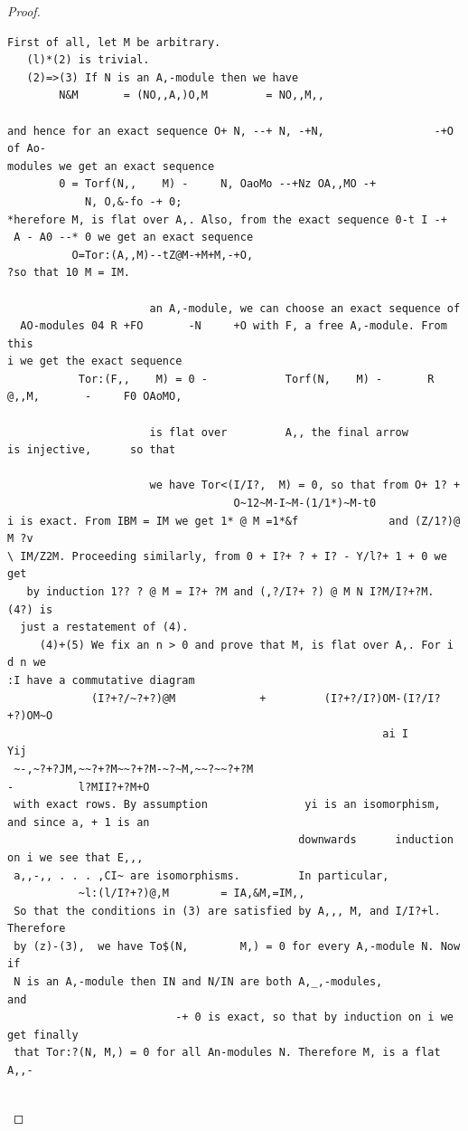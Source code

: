 \begin{proof}
\begin{verbatim}
First of all, let M be arbitrary.
   (l)*(2) is trivial.
   (2)=>(3) If N is an A,-module then we have
        N&M       = (NO,,A,)O,M         = NO,,M,,

and hence for an exact sequence O+ N, --+ N, -+N,                 -+O of Ao-
modules we get an exact sequence
        0 = Torf(N,,    M) -     N, OaoMo --+Nz OA,,MO -+
            N, O,&-fo -+ 0;
*herefore M, is flat over A,. Also, from the exact sequence 0-t I -+
 A - A0 --* 0 we get an exact sequence
          O=Tor:(A,,M)--tZ@M-+M+M,-+O,
?so that 10 M = IM.

                      an A,-module, we can choose an exact sequence of
  AO-modules 04 R +FO       -N     +O with F, a free A,-module. From this
i we get the exact sequence
           Tor:(F,,    M) = 0 -            Torf(N,    M) -       R @,,M,       -     F0 OAoMO,

                      is flat over         A,, the final arrow          is injective,      so that

                      we have Tor<(I/I?,  M) = 0, so that from O+ 1? +
                                   O~12~M-I~M-(1/1*)~M-t0
i is exact. From IBM = IM we get 1* @ M =1*&f              and (Z/1?)@ M ?v
\ IM/Z2M. Proceeding similarly, from 0 + I?+ ? + I? - Y/l?+ 1 + 0 we get
   by induction 1?? ? @ M = I?+ ?M and (,?/I?+ ?) @ M N I?M/I?+?M.     (4?) is
  just a restatement of (4).
     (4)+(5) We fix an n > 0 and prove that M, is flat over A,. For i d n we
:I have a commutative diagram
             (I?+?/~?+?)@M             +         (I?+?/I?)OM-(I?/I?+?)OM~O
                                                          ai I                       Yij
 ~-,~?+?JM,~~?+?M~~?+?M-~?~M,~~?~~?+?M                                  -          l?MII?+?M+O
 with exact rows. By assumption               yi is an isomorphism,          and since a, + 1 is an
                                             downwards      induction        on i we see that E,,,
 a,,-,, . . . ,CI~ are isomorphisms.         In particular,
           ~l:(l/I?+?)@,M        = IA,&M,=IM,,
 So that the conditions in (3) are satisfied by A,,, M, and I/I?+l. Therefore
 by (z)-(3),  we have To$(N,        M,) = 0 for every A,-module N. Now if
 N is an A,-module then IN and N/IN are both A,_,-modules,                   and
                          -+ 0 is exact, so that by induction on i we get finally
 that Tor:?(N, M,) = 0 for all An-modules N. Therefore M, is a flat A,,-


\end{verbatim}
\end{proof}
